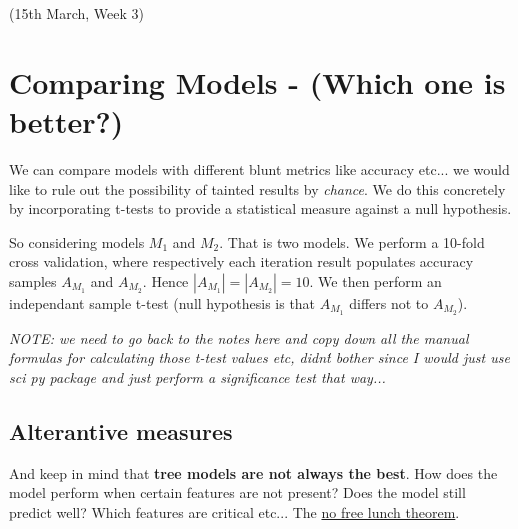 \documentclass{article}
\begin{document}
(15th March, Week 3)
\section{Comparing Models - (Which one is better?)}
We can compare models with different blunt metrics like accuracy etc... we would like to rule out the possibility of tainted results by {\em chance}. We do this concretely by incorporating t-tests to provide a statistical measure against a null hypothesis.

So considering models $M_1$ and $M_2$. That is two models. We perform a 10-fold cross validation, where respectively each iteration result populates accuracy samples $A_{M_1}$ and $A_{M_2}$. Hence $|A_{M_1}| = |A_{M_2}| = 10$. We then perform an independant sample t-test (null hypothesis is that $A_{M_1}$ differs not to $A_{M_2}$).

{\em NOTE: we need to go back to the notes here and copy down all the manual formulas for calculating those t-test values etc, didn\'t bother since I would just use sci py package and just perform a significance test that way...}

\subsection{Alterantive measures}
And keep in mind that {\bf tree models are not always the best}. How does the model perform when certain features are not present? Does the model still predict well? Which features are critical etc... The \href{https://en.wikipedia.org/wiki/No_free_lunch_theorem}{no free lunch theorem}.
\end{document}
